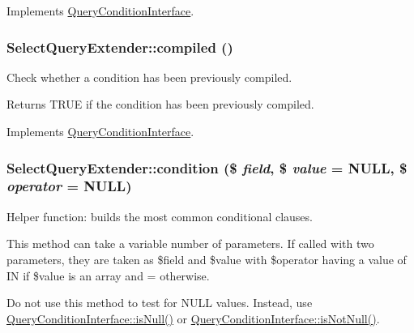 Implements \hyperlink{interfaceQueryConditionInterface_ad409672ac9ac50787eec52ecdf5a60b1}{QueryConditionInterface}.\hypertarget{classSelectQueryExtender_ae8449b348179f2717a6f07e14f3c806c}{
\subsubsection[{compiled}]{\setlength{\rightskip}{0pt plus 5cm}SelectQueryExtender::compiled ()}}
\label{classSelectQueryExtender_ae8449b348179f2717a6f07e14f3c806c}
Check whether a condition has been previously compiled.

\begin{DoxyReturn}{Returns}
TRUE if the condition has been previously compiled. 
\end{DoxyReturn}


Implements \hyperlink{interfaceQueryConditionInterface_a4aac3f4505275edecad9c22351e591cb}{QueryConditionInterface}.\hypertarget{classSelectQueryExtender_a65446d6584a53f1c2be79dd1fd3bffdd}{
\subsubsection[{condition}]{\setlength{\rightskip}{0pt plus 5cm}SelectQueryExtender::condition (\$ {\em field}, \/  \$ {\em value} = {\ttfamily NULL}, \/  \$ {\em operator} = {\ttfamily NULL})}}
\label{classSelectQueryExtender_a65446d6584a53f1c2be79dd1fd3bffdd}
Helper function: builds the most common conditional clauses.

This method can take a variable number of parameters. If called with two parameters, they are taken as \$field and \$value with \$operator having a value of IN if \$value is an array and = otherwise.

Do not use this method to test for NULL values. Instead, use \hyperlink{interfaceQueryConditionInterface_a2978b536a3fe62b21e940366c9cb5923}{QueryConditionInterface::isNull()} or \hyperlink{interfaceQueryConditionInterface_a8bbb6acc9c72911b165cf6eb1dc31453}{QueryConditionInterface::isNotNull()}.


